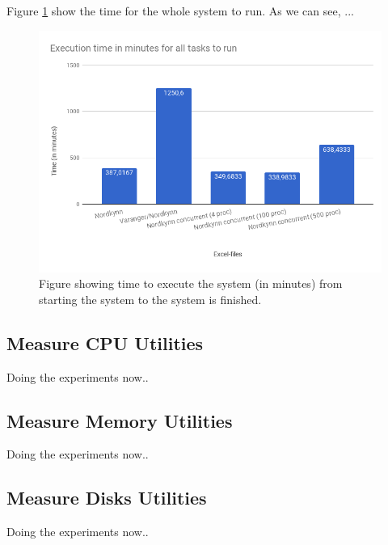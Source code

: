 \documentclass[USenglish]{uit-thesis}
\begin{document}

Figure \ref{fig:time_chart_overall} show the time for the whole system to run. As we can see, ...

\begin{figure}
\centering
\includegraphics[width=\textwidth]{chart2_done.png}
\caption{Figure showing time to execute the system (in minutes) from starting the system to the system is finished.}
\label{fig:time_chart_overall}
\end{figure}



\subsection{Measure CPU Utilities}
Doing the experiments now..

\subsection{Measure Memory Utilities}
Doing the experiments now..

\subsection{Measure Disks Utilities}
Doing the experiments now..
\end{document}

